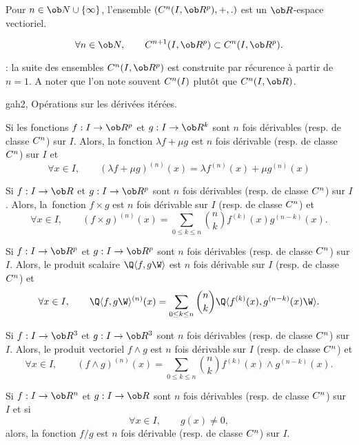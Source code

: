 \Propriete Pour $n\in\ob N\cup\{\infty\}$, l'ensemble $(\sc C^n(I,\ob R^p), +, .)$ est un $\ob R$-espace vectioriel. 

\Propriete
$$
\forall n\in\ob N, \qquad \sc C^{n+1}(I,\ob R^p)\subset\sc C^n(I,\ob R^p).
$$ 

\Remarque : la suite des ensembles $\sc C^n(I,\ob R^p)$ est construite par récurence à partir de $n=1$. A noter que l'on note souvent $\sc C^n(I)$ plutôt que $\sc C^n(I,\ob R)$. 
\bigskip


\Subsection gah2, Opérations sur les dérivées itérées. 

Si les fonctions $f:I\to\ob R^p$ et $g:I\to\ob R^k$ sont $n$ fois dérivables (resp. de classe $\sc C^n$) sur $I$. 
Alors, la fonction $\lambda f+\mu g$ est $n$ fois dérivable (resp. de classe $\sc C^n$) sur $I$ et 
$$
\forall x\in I, \qquad (\lambda f+\mu g)^{(n)}(x)=\lambda f^{(n)}(x)+\mu g^{(n)}(x)
$$

\Theoreme [Title=Formule de Leibniz;$I$ intervalle, $n\in\ob N$]
Si $f:I\to\ob R$ et $g:I\to\ob R^p$ sont $n$ fois dérivables (resp. de classe $\sc C^n$) sur $I$. 
Alors, la~fonction $f\times g$ est $n$ fois dérivable sur $I$ (resp. de classe $\sc C^n$) et 
$$
\forall x\in I, \qquad (f\times g)^{(n)}(x)=\sum_{0\le k\le n}{n\choose k}f^{(k)}(x)g^{(n-k)}(x).
$$


Si $f:I\to\ob R^p$ et $g:I\to\ob R^p$ sont $n$ fois dérivables (resp. de classe $\sc C^n$) sur $I$. 
Alors, le produit scalaire $\Q\langle f,g\W\rangle$ est $n$ fois dérivable sur $I$ (resp. de classe $\sc C^n$) et 
$$
\forall x\in I, \qquad \Q\langle f,g\W\rangle^{(n)}(x)=\sum_{0\le k\le n}{n\choose k}\Q\langle f^{(k)}(x),g^{(n-k)}(x)\W\rangle.
$$

\Theoreme [$I$ intervalle, $n\in\ob N$]
Si $f:I\to\ob R^3$ et $g:I\to\ob R^3$ sont $n$ fois dérivables (resp. de classe $\sc C^n$) sur $I$. 
Alors, le produit vectoriel $f\wedge g$ est $n$ fois dérivable sur $I$ (resp. de classe $\sc C^n$) et 
$$
\forall x\in I, \qquad (f\wedge g)^{(n)}(x)=\sum_{0\le k\le n}{n\choose k}f^{(k)}(x)\wedge g^{(n-k)}(x).
$$


Si $f:I\to\ob R^n$ et $g:I\to\ob R$ sont $n$ fois dérivables (resp. de classe $\sc C^n$) sur $I$ et si 
$$
\forall x\in I, \qquad g(x)\neq 0,
$$ 
alors, la fonction $f/g$ est $n$ fois dérivable (resp. de classe $\sc C^n$) sur $I$. 

